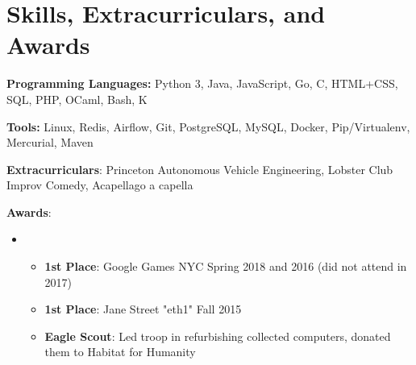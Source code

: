 \documentclass[11pt,letterpaper,sans]{moderncv}        %
\begin{document}




\vspace{-5pt}
\section{Skills, Extracurriculars, and Awards}

\textbf{Programming Languages:} Python 3, Java, JavaScript, Go, C, HTML+CSS, SQL, PHP, OCaml, Bash, K

\textbf{Tools:} Linux, Redis, Airflow, Git, PostgreSQL, MySQL, Docker, Pip/Virtualenv, Mercurial, Maven

\textbf{Extracurriculars}: Princeton Autonomous Vehicle Engineering, Lobster Club Improv Comedy, Acapellago a capella

\textbf{Awards}:
\begin{itemize}
    \item[]\begin{itemize}

    \item{\textbf{1st Place}: Google Games NYC Spring 2018 and 2016 (did not attend in 2017)}
    \item{\textbf{1st Place}: Jane Street "eth1" Fall 2015}
    \item{\textbf{Eagle Scout}: Led troop in refurbishing collected computers, donated them to Habitat for Humanity}
    \end{itemize}
\end{itemize}


\nocite{*}



\end{document}
